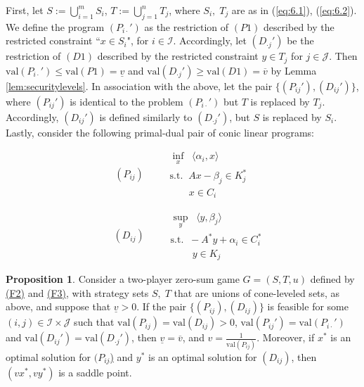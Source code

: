 \documentclass[11pt, twoside]{article}
\numberwithin{equation}{section}
\theoremstyle{definition}
\newtheorem{proposition}{Proposition}[section]
\begin{document}
 First, let $S:=\bigcup_{i=1}^{m}S_i$, $T:= \bigcup_{j=1}^{n}T_j$, where $S_i,\;T_j$ are as in (\ref{eq:6.1}), (\ref{eq:6.2}). We define the program $(P_{i\cdot}')$ as the restriction of \hyperlink{p1}{$(P1)$} described by the restricted constraint ``$x\in S_i$", for $i\in\mathcal{I}$. Accordingly, let $(D_{\cdot j}')$ be the restriction of \hyperlink{d1}{$(D1)$} described by the restricted constraint $y\in T_j$ for $j\in\mathcal{J}$. Then $\text{val}(P_{i\cdot}')\leq \text{val}(P1)=\underline{v}$ and $\text{val}(D_{\cdot j}')\geq \text{val}(D1)=\overline{v}$ by Lemma \ref{lem:securitylevels}. In association with the above, let the pair $\{(P_{ij}'),(D_{ij}')\}$, where $(P_{ij}')$ is identical to the problem $(P_{i\cdot}')$ but $T$ is replaced by $T_j$. Accordingly, $(D_{ij}')$ is defined similarly to $(D_{\cdot j}')$, but $S$ is replaced by $S_i$. Lastly, consider the following primal-dual pair of conic linear programs:
\hypertarget{primaldualij}{}\hypertarget{pij}{} \hypertarget{dij}{}
\begin{center}
\vspace{-0.7cm}\begin{equation*}{(P_{ij})\;\;\;\;\;\;\;\;}
\begin{array}{ll}
    \inf\limits_{x}\;\; \langle \alpha_i,x\rangle\\
    \text{s.t.}\;\; Ax-\beta_j\in K_j^*\\ \;\;\;\;\;\;\;x\in C_i
    \end{array}
\end{equation*}
\end{center}
\begin{center}
\vspace{-0.7cm}\begin{equation*}{\;\;\;\;\;(D_{ij})\;\;\;\;\;\;\;\;}
\begin{array}{ll}
    \sup\limits_{y}\;\; \langle y,\beta_j\rangle\\
    \text{s.t.}\;\; -A^*y+\alpha_i\in C_i^*\\ \;\;\;\;\;\;\;\;y\in K_j
    \end{array}
    \end{equation*}
\end{center}
\begin{proposition}\label{prop:6.2}
    Consider a two-player zero-sum game $G=(S,T,u)$ defined by \hyperlink{f2}{(F2)} and \hyperlink{f3}{(F3)}, with strategy sets $S,\;T$ that are unions of cone-leveled sets, as above, and suppose that $\underline{v}>0$. If the pair \hyperlink{primaldualij}{$\{(P_{ij}),(D_{ij})\}$} is feasible for some $(i,j)\in\mathcal{I}\times\mathcal{J}$ such that $\text{val}(P_{ij})=\text{val}(D_{ij})>0$, $\text{val}(P_{ij}')=\text{val}(P_{i\cdot}')$ and $\text{val}(D_{ij}')=\text{val}(D_{\cdot j}')$, then $\underline{v}=\overline{v}$, and $v=\frac{1}{\text{val}(P_{ij})}$. Moreover, if $x^*$ is an optimal solution for \hyperlink{pij}{$(P_{ij}$)} and $y^*$ is an optimal solution for \hyperlink{dij}{$(D_{ij})$}, then $(vx^*,vy^*)$ is a saddle point. 
\end{proposition}
\end{document}
